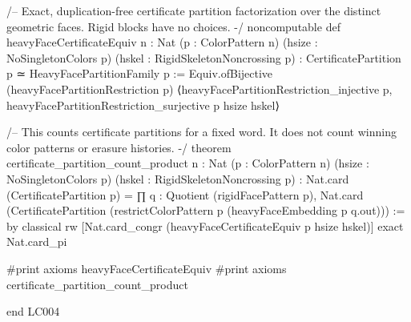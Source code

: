 \documentclass[11pt,reqno]{amsart}
\theoremstyle{definition}
\begin{document}
\begin{LeanCode}
/-- Exact, duplication-free certificate partition factorization over the
distinct geometric faces. Rigid blocks have no choices. -/
noncomputable def heavyFaceCertificateEquiv {n : Nat} (p : ColorPattern n)
    (hsize : NoSingletonColors p) (hskel : RigidSkeletonNoncrossing p) :
    CertificatePartition p ≃ HeavyFacePartitionFamily p :=
  Equiv.ofBijective (heavyFacePartitionRestriction p)
    ⟨heavyFacePartitionRestriction_injective p,
      heavyFacePartitionRestriction_surjective p hsize hskel⟩

/-- This counts certificate partitions for a fixed word. It does not count
winning color patterns or erasure histories. -/
theorem certificate_partition_count_product {n : Nat} (p : ColorPattern n)
    (hsize : NoSingletonColors p) (hskel : RigidSkeletonNoncrossing p) :
    Nat.card (CertificatePartition p) =
      ∏ q : Quotient (rigidFacePattern p),
        Nat.card (CertificatePartition (restrictColorPattern p (heavyFaceEmbedding p q.out))) := by
  classical
  rw [Nat.card_congr (heavyFaceCertificateEquiv p hsize hskel)]
  exact Nat.card_pi

#print axioms heavyFaceCertificateEquiv
#print axioms certificate_partition_count_product

end LC004
\end{LeanCode}
\clearpage

\nocite{AlexandriaCoreSnapshot,SameGameProofSnapshot,GitHubPagesDocs}

\end{document}
